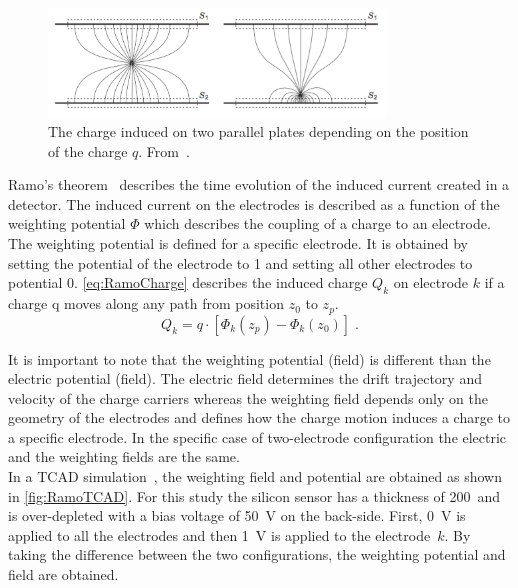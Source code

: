 \begin{figure}[htbp]
  \centering
  \includegraphics[width=0.8\textwidth]{figures/Ramo/InducedCharge_parallelPlates.png}
  \caption{The charge induced on two parallel plates depending on the
    position of the charge $q$. From~\cite{Spieler2005}.}
  \label{fig:InducedCharge_parallelPlates}
\end{figure}

Ramo's theorem~\cite{Ramo:1939vr} describes the time evolution of the induced current
created in a detector. The induced current on the electrodes is
described as a function of the weighting potential $\Phi$ which
describes the coupling of a charge to an electrode. \\
The weighting potential is defined for a specific electrode. It is
obtained by setting the potential of the electrode to 1 and setting
all other electrodes to potential 0. \cref{eq:RamoCharge}
describes the induced charge $Q_k$ on electrode $k$ if a charge q moves along
any path from position $z_0$ to $z_p$.
\begin{equation}
    Q_{k}=q \cdot [\Phi_k(z_p)-\Phi_k(z_0)] \; .
   \label{eq:RamoCharge} 
  \end{equation}

 It is important to note that the weighting potential (field) is
 different than the electric potential (field). The electric field
 determines the drift trajectory and velocity of the charge carriers
 whereas the weighting field depends only on the geometry of the
 electrodes and defines how the charge motion induces a charge to a
 specific electrode. In the specific case of two-electrode configuration the
 electric and the weighting fields are the same. \\
In a TCAD simulation~\cite{synopsysTCAD}, the weighting field and potential are obtained
as shown in \cref{fig:RamoTCAD}. For this study the silicon
sensor has a thickness of 200~\micron and is over-depleted with a bias
voltage of \SI{50}{\volt} on the back-side. First, \SI{0}{\volt} is
applied to all the electrodes and then \SI{1}{\volt} is applied to the
electrode~$k$. By taking the difference between the two
configurations, the weighting potential and field are obtained.



